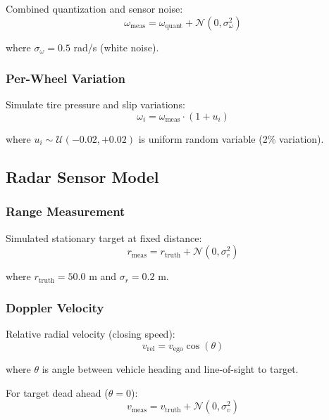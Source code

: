 \documentclass[11pt,a4paper]{article}
\begin{document}
Combined quantization and sensor noise:
\begin{equation}
\omega_{\text{meas}} = \omega_{\text{quant}} + \mathcal{N}(0, \sigma_{\omega}^2)
\end{equation}

where $\sigma_{\omega} = 0.5$ rad/s (white noise).

\subsubsection{Per-Wheel Variation}

Simulate tire pressure and slip variations:
\begin{equation}
\omega_i = \omega_{\text{meas}} \cdot (1 + u_i)
\end{equation}

where $u_i \sim \mathcal{U}(-0.02, +0.02)$ is uniform random variable (2\% variation).

\subsection{Radar Sensor Model}

\subsubsection{Range Measurement}

Simulated stationary target at fixed distance:
\begin{equation}
r_{\text{meas}} = r_{\text{truth}} + \mathcal{N}(0, \sigma_r^2)
\end{equation}

where $r_{\text{truth}} = 50.0$ m and $\sigma_r = 0.2$ m.

\subsubsection{Doppler Velocity}

Relative radial velocity (closing speed):
\begin{equation}
v_{\text{rel}} = v_{\text{ego}} \cos(\theta)
\end{equation}

where $\theta$ is angle between vehicle heading and line-of-sight to target.

For target dead ahead ($\theta = 0$):
\begin{equation}
v_{\text{meas}} = v_{\text{truth}} + \mathcal{N}(0, \sigma_v^2)
\end{equation}
\end{document}
